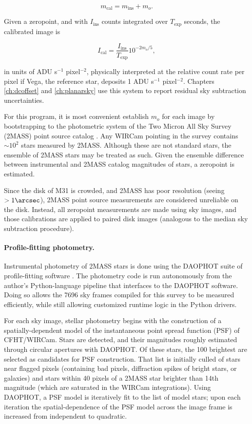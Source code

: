 \documentclass[iop]{emulateapj}
\begin{document}
\begin{equation}
    m_\mathrm{cal} = m_\mathrm{ins} + m_o.
    \label{eq:zpdefinition}
\end{equation}

Given a zeropoint, and with $I_\mathrm{ins}$ counts integrated over $T_\text{exp}$ seconds, the calibrated image is

\begin{equation}
    I_\mathrm{cal} = \frac{I_\mathrm{ins}}{T_\text{exp}} 10^{-2m_o/5},
    \label{eq:fluxcalibration}
\end{equation}

\noindent in units of ADU s$^{-1}$ pixel$^{-2}$, physically interpreted at the relative count rate per pixel if Vega, the reference star, deposits 1 ADU s$^{-1}$ pixel$^{-2}$. Chapters \ref{ch:dcoffset} and \ref{ch:planarsky} use this system to report residual sky subtraction uncertainties.

For this program, it is most convenient establish $m_o$ for each image by bootstrapping to the photometric system of the Two Micron All Sky Survey (2MASS) point source catalog \citep{Skrutskie:2006}. Any WIRCam pointing in the survey contains $\sim 10^2$ stars measured by 2MASS. Although these are not standard stars, the ensemble of 2MASS stars may be treated as such. Given the ensemble difference between instrumental and 2MASS catalog magnitudes of stars, a zeropoint is estimated.

Since the disk of M31 is crowded, and 2MASS has poor resolution (seeing $> 1\arcsec$), 2MASS point source measurements are considered unreliable on the disk. Instead, all zeropoint measurements are made using sky images, and those calibrations are applied to paired disk images (analogous to the median sky subtraction procedure).

\paragraph{Profile-fitting photometry.} Instrumental photometry of 2MASS stars is done using the DAOPHOT suite of profile-fitting software \citep{Stetson:1987}. The photometry code is run autonomously from the author's Python-language pipeline that interfaces to the DAOPHOT software. Doing so allows the 7696 sky frames compiled for this survey to be measured efficiently, while still allowing customized runtime logic in the Python drivers.

For each sky image, stellar photometry begins with the construction of a spatially-dependent model of the instantaneous point spread function (PSF) of CFHT/WIRCam. Stars are detected, and their magnitudes roughly estimated through circular apertures with DAOPHOT. Of these stars, the 100 brightest are selected as candidates for PSF construction. That list is initially culled of stars near flagged pixels (containing bad pixels, diffraction spikes of bright stars, or galaxies) and stars within 40 pixels of a 2MASS star brighter than 14th magnitude (which are saturated in the WIRCam integrations). Using DAOPHOT, a PSF model is iteratively fit to the list of model stars; upon each iteration the spatial-dependence of the PSF model across the image frame is increased from independent to quadratic.
\end{document}
